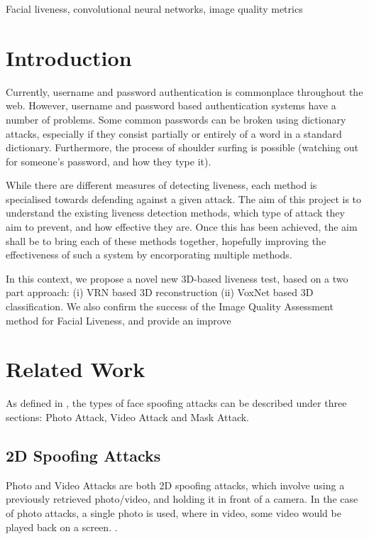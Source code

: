 \documentclass[10pt,a4paper]{article}
\begin{document}
\begin{keywords}
Facial liveness, convolutional neural networks, image quality metrics
\end{keywords}

\section{Introduction}
    Currently, username and password authentication is commonplace throughout the web. However, username and password
    based authentication systems have a number of problems. Some common passwords can be broken using dictionary attacks,
    especially if they consist partially or entirely of a word in a standard dictionary. Furthermore, the process of shoulder surfing is possible (watching out
    for someone's password, and how they type it).

   While there are different measures of detecting liveness, each method is specialised towards defending against a given attack. The aim of this project is to understand
   the existing liveness detection methods, which type of attack they aim to prevent, and how effective they are. Once this has been achieved, the aim shall be to bring
   each of these methods together, hopefully improving the effectiveness of such a system by encorporating multiple methods.


    In this context, we propose a novel new 3D-based liveness test, based on a two part approach: (i) VRN based 3D reconstruction (ii) VoxNet based 3D classification.
    We also confirm the success of the Image Quality Assessment method for Facial Liveness, and provide an improve

\section{Related Work}
    As defined in \cite{FaceSpoofingAttacksStudy}, the types of face spoofing attacks can be described under three sections: Photo Attack, Video Attack and Mask Attack.

    \subsection{2D Spoofing Attacks}
        Photo and Video Attacks are both 2D spoofing attacks, which involve using a previously retrieved photo/video, and holding it in front of a camera. In the case of photo attacks,
        a single photo is used, where in video, some video would be played back on a screen. \cite{FaceSpoofingAttacksStudy}.
\end{document}
